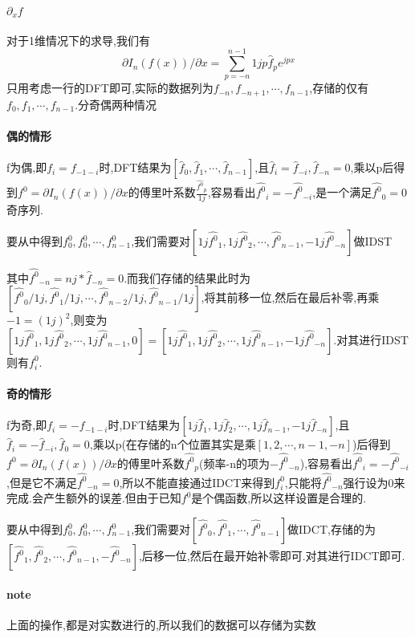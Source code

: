 \documentclass[UTF8]{ctexart}
\begin{document}
\paragraph{$\partial_x f$}
对于1维情况下的求导,我们有
$$
\partial I_n(f(x))/\partial x =  \sum\limits_{p=-n}^{n-1}1jp\hat{f}_p e^{jpx}
$$
只用考虑一行的DFT即可,实际的数据列为$f_{-n},f_{-n+1},\cdots,f_{n-1}$,存储的仅有$f_0,f_1,\cdots,f_{n-1}$.分奇偶两种情况
\paragraph{偶的情形}
  f为偶,即$f_i=f_{-1-i}$时,DFT结果为$[\hat{f}_0,\hat{f}_1,\cdots,\hat{f}_{n-1}]$,且$\hat{f}_i=\hat{f}_{-i},\hat{f}_{-n}=0$,乘以p后得到$f^0=\partial I_n(f(x))/\partial x $的傅里叶系数$ \frac{\hat{f^0}_p}{1j}$,容易看出$\hat{f^0}_i=-\hat{f^0}_{-i}$,是一个满足$\hat{f^0}_0=0$奇序列.
  
  要从中得到$f^0_0,f^0_0,\cdots,f^0_{n-1}$,我们需要对$[1j\hat{f^0}_1,1j\hat{f^0}_2,\cdots,\hat{f^0}_{n-1},-1j\hat{f^0}_{-n}]$做IDST
  
  其中$\hat{f^0}_{-n}=nj*\hat{f}_{-n}=0$.而我们存储的结果此时为$[\hat{f^0} _0/1j,\hat{f^0}_1/1j,\cdots,\hat{f^0}_{n-2}/1j,\hat{f^0}_{n-1}/1j]$,将其前移一位,然后在最后补零,再乘$-1=(1j)^2$,则变为$[1j\hat{f^0} _1,1j\hat{f^0}_2,\cdots,1j\hat{f^0}_{n-1},0]=[1j\hat{f^0} _1,1j\hat{f^0}_2,\cdots,1j\hat{f^0}_{n-1},-1j\hat{f^0}_{-n}]$.对其进行IDST则有$f^0_i$.
  
\paragraph{奇的情形}
 f为奇,即$f_i=-f_{-1-i}$时,DFT结果为$[1j\hat{f}_1,1j\hat{f}_2,\cdots,1j\hat{f}_{n-1},-1j\hat{f}_{-n}]$,且$\hat{f}_i=-\hat{f}_{-i},\hat{f}_{0}=0$,乘以p(在存储的n个位置其实是乘$[1,2,\cdots,n-1,-n]$)后得到$f^0=\partial I_n(f(x))/\partial x $的傅里叶系数$ \hat{f^0}_p$(频率-n的项为$-\hat{f^0}_{-n}$),容易看出$\hat{f^0}_i=-\hat{f^0}_{-i}$,但是它不满足$\hat{f^0}_{-n}=0$,所以不能直接通过IDCT来得到$f^0_i$,只能将$\hat{f^0} _{-n}$强行设为0来完成.会产生额外的误差.但由于已知$f^0$是个偶函数,所以这样设置是合理的.
 
 要从中得到$f^0_0,f^0_0,\cdots,f^0_{n-1}$,我们需要对$[\hat{f^0}_0,\hat{f^0}_1,\cdots,\hat{f^0}_{n-1}]$做IDCT,存储的为$[\hat{f^0}_1,\hat{f^0}_2,\cdots,\hat{f^0}_{n-1},-\hat{f^0}_{-n}]$,后移一位,然后在最开始补零即可.对其进行IDCT即可.
 
\paragraph{note}
上面的操作,都是对实数进行的,所以我们的数据可以存储为实数
 
\end{document}

